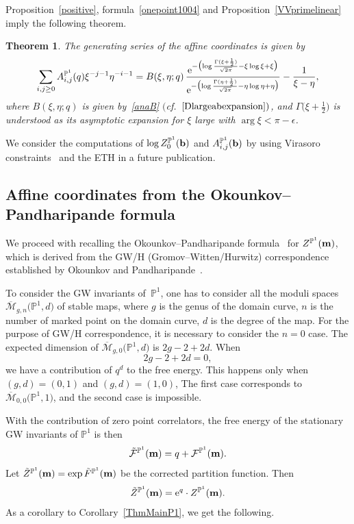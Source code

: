 \documentclass[pdftex]{sigma}
\newcommand{\bP}{\mathbb{P}}
\newcommand{\F}{\mathcal{F}}
\newcommand{\Mbar}{\overline{\mathcal M}}
\newcommand{\be}{\begin{equation}}
\newcommand{\ee}{\end{equation}}
\numberwithin{equation}{section}
\newtheorem{Theorem}{Theorem}[section]
\begin{document}
Proposition~\ref{positive}, formula~\eqref{onepoint1004} and Proposition~\ref{VVprimelinear} imply the following theorem.
\begin{Theorem}\label{affine1}
The generating series of the affine coordinates \smash{$A^{\bP^1}_{i,j}(q)$}
is given by
\begin{gather*}%
\sum_{i,j \geq 0} A^{\bP^1}_{i,j}(q) \xi^{-j-1} \eta^{-i-1}
=B(\xi,\eta;q) \, \frac{{\rm e}^{-\bigl(\log \frac{\Gamma(\xi+\frac{1}{2})}{\sqrt{2\pi}} -\xi\log \xi + \xi\bigr)}}
{{\rm e}^{-\bigl(\log \frac{\Gamma(\eta+\frac{1}{2})}{\sqrt{2\pi}} -\eta\log \eta + \eta\bigr)}} - \frac1{\xi-\eta},
\end{gather*}
where $B(\xi,\eta;q)$ is given by~\eqref{anaB} $($cf.\ $\eqref{Dlargeabexpansion})$, and $\Gamma\bigl(\xi+\frac{1}{2}\bigr)$ is understood as its asymptotic expansion for $\xi$ large with $\operatorname{arg} \xi <\pi-\epsilon$.
\end{Theorem}

\begin{Remark}
We consider the computations of $\log Z^{\bP^1}_0({\bf b})$ and $A^{\bP^1}_{i,j}({\bf b})$
 by using Virasoro constraints~\cite{DZ-toda} and the ETH in a future publication.
\end{Remark}

\subsection{Affine coordinates from the Okounkov--Pandharipande formula}
We proceed with recalling the Okounkov--Pandharipande formula~\cite{OP1} for $Z^{\bP^1}({\bf m})$, which is
derived from the GW/H (Gromov--Witten/Hurwitz)
correspondence established by Okounkov and Pandharipande~\cite{OP1}.

To consider the GW invariants of~$\bP^1$,
one has to consider all the moduli spaces $\Mbar_{g,n}\bigl(\bP^1, d\bigr)$ of stable maps,
where $g$ is the genus of the domain curve,
$n$ is the number of marked point on the domain curve,
$d$ is the degree of the map.
For the purpose of GW/H correspondence,
it is necessary to consider the $n=0$ case.
The expected dimension of $\Mbar_{g,0}\bigl(\bP^1, d\bigr)$ is
$2g-2+2d$.
When
\[
2g-2+2d = 0,
\]
we have a contribution of $q^d$ to the free energy.
This happens only when $(g,d) = (0,1)$ and ${(g,d)=(1,0)}$,
The first case corresponds to $\Mbar_{0,0}\bigl(\bP^1,1\bigr)$,
and the second case is impossible.

With the contribution of zero point correlators,
the free energy of the stationary GW invariants of $\bP^1$ is
then
\[
\tilde{\F}^{\bP^1}({\bf m}) = q + \F^{\bP^1}({\bf m}).
\]
Let $\tilde{Z}^{\bP^1}({\bf m}) = \exp \tilde{F}^{\bP^1}({\bf m})$ be the corrected partition function.
Then
\be\label{deftildeZ}
\tilde{Z}^{\bP^1}({\bf m}) = {\rm e}^q \cdot Z^{\bP^1}({\bf m}).
\ee
As a corollary to Corollary~\ref{ThmMainP1}, we get the following.
\end{document}
